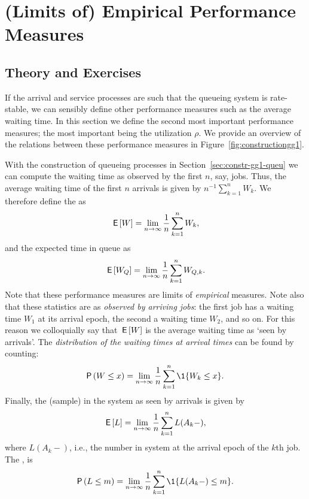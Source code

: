 \section{(Limits of) Empirical Performance Measures}
\label{sec:limits-of-emperical}


\subsection*{Theory and Exercises}


If the arrival and service processes are such that the queueing system
is rate-stable, we can sensibly define other performance measures such
as the average waiting time. In this section we define the second most
important performance measures; the most important being the
utilization $\rho$. We provide an overview of the relations between
these performance measures in Figure~\ref{fig:constructiongg1}.


With the construction of queueing processes in
Section~\ref{sec:constr-gg1-queu} we can compute the waiting time as
observed by the first $n$, say, jobs. Thus, the average waiting time
of the first $n$ arrivals is given by $n^{-1}\sum_{k=1}^n W_k$. We
therefore define the  as
\begin{equation}\label{eq:49}
  \,\mathsf{E}\left[W\right] = \lim_{n\to\infty} \frac 1n\sum_{k=1}^n W_k,
\end{equation}
and the expected time in queue as
\begin{equation}\label{eq:50}
  \,\mathsf{E}\left[W_Q\right] = \lim_{n\to\infty} \frac 1 n\sum_{k=1}^n W_{Q,k}.
\end{equation}
Note that these performance measures are limits of \emph{empirical}
measures.  Note also that these statistics are as \emph{observed by
  arriving jobs}: the first job has a waiting time $W_1$ at its
arrival epoch, the second a waiting time $W_2$, and so on. For this
reason we colloquially say that $\,\mathsf{E}\left[W\right]$ is the average waiting time as
`seen by arrivals'.  The \emph{distribution of the waiting times at
  arrival times} can be found by counting:
\begin{equation}\label{eq:48}
  \P{W \leq x}  = \lim_{n\to\infty} \frac 1n\sum_{k=1}^n \1{W_k\leq x}.
\end{equation}
Finally, the (sample)  in the system as seen by
arrivals is given by
\begin{equation}\label{eq:EQ}
\,\mathsf{E}\left[L\right] =  \lim_{n\to\infty}\frac 1 n \sum_{k=1}^n L(A_k-),
\end{equation}
where $L(A_k-)$, i.e., the number in system at the arrival epoch
of the $k$th job.  The , is
\begin{equation}\label{eq:Qm}
\P{L\leq m} = \lim_{n\to\infty} \frac 1 n \sum_{k=1}^n \1{L(A_k-) \leq m}.
\end{equation}


